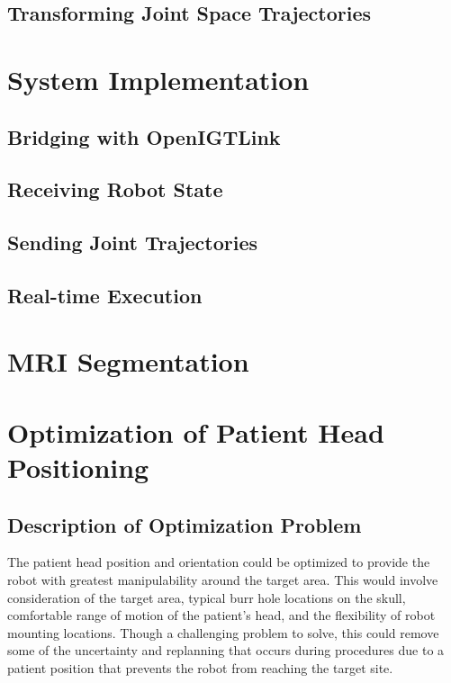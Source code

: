 \documentclass[12pt]{report}
\begin{document}
\section{Transforming Joint Space Trajectories}

\chapter{System Implementation}
\section{Bridging with OpenIGTLink}
\section{Receiving Robot State}
\section{Sending Joint Trajectories}
\section{Real-time Execution}

\chapter{MRI Segmentation}

\chapter{Optimization of Patient Head Positioning}
\section{Description of Optimization Problem}
The patient head position and orientation could be optimized to provide the robot with greatest manipulability around the target area. This would involve consideration of the target area, typical burr hole locations on the skull, comfortable range of motion of the patient’s head, and the flexibility of robot mounting locations. Though a challenging problem to solve, this could remove some of the uncertainty and replanning that occurs during procedures due to a patient position that prevents the robot from reaching the target site.
\end{document}
